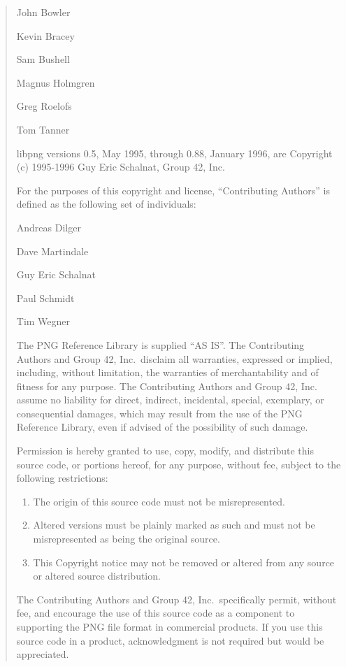 \documentclass[
]{book}
\theoremstyle{definition}
\theoremstyle{definition}
\theoremstyle{definition}
\theoremstyle{definition}
\theoremstyle{remark}
\begin{document}
\begin{quote}
John Bowler

Kevin Bracey

Sam Bushell

Magnus Holmgren

Greg Roelofs

Tom Tanner

libpng versions 0.5, May 1995, through 0.88, January 1996, are
Copyright (c) 1995-1996 Guy Eric Schalnat, Group 42, Inc.

For the purposes of this copyright and license, ``Contributing Authors''
is defined as the following set of individuals:

Andreas Dilger

Dave Martindale

Guy Eric Schalnat

Paul Schmidt

Tim Wegner

The PNG Reference Library is supplied ``AS IS''. The Contributing Authors
and Group 42, Inc.~disclaim all warranties, expressed or implied,
including, without limitation, the warranties of merchantability and of
fitness for any purpose. The Contributing Authors and Group 42, Inc.
assume no liability for direct, indirect, incidental, special, exemplary,
or consequential damages, which may result from the use of the PNG
Reference Library, even if advised of the possibility of such damage.

Permission is hereby granted to use, copy, modify, and distribute this
source code, or portions hereof, for any purpose, without fee, subject
to the following restrictions:

\begin{enumerate}
\def\labelenumi{\arabic{enumi}.}
\item
  The origin of this source code must not be misrepresented.
\item
  Altered versions must be plainly marked as such and must not
  be misrepresented as being the original source.
\item
  This Copyright notice may not be removed or altered from any
  source or altered source distribution.
\end{enumerate}

The Contributing Authors and Group 42, Inc.~specifically permit, without
fee, and encourage the use of this source code as a component to
supporting the PNG file format in commercial products. If you use this
source code in a product, acknowledgment is not required but would be
appreciated.


\end{quote}
\end{document}
